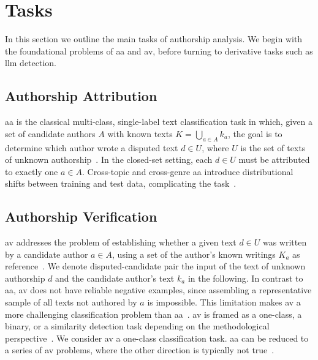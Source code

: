 \section{Tasks}
\label{sec:tasks}

In this section we outline the main tasks of authorship analysis. 
We begin with the foundational problems of \ac{aa} and \ac{av}, before turning to derivative tasks such as \ac{llm} detection.

\subsection{Authorship Attribution}
\ac{aa} is the classical multi-class, single-label text classification task in which, given a set of candidate authors $A$ with known texts $K=\bigcup_{a\in A} k_a$, the goal is to determine which author wrote a disputed text $d \in U$, where $U$ is the set of texts of unknown authorship~\citep{koppel_authorship_2004,barlas_cross_domain_2020}. 
In the closed-set setting, each $d \in U$ must be attributed to exactly one $a \in A$. 
Cross-topic and cross-genre \ac{aa} introduce distributional shifts between training and test data, complicating the task~\citep{barlas_cross_domain_2020}.

\subsection{Authorship Verification}
\ac{av} addresses the problem of establishing whether a given text $d \in U$ was written by a candidate author $a \in A$, using a set of the author’s known writings $K_a$ as reference~\citep{koppel_authorship_2004}.
We denote disputed-candidate pair the input of the text of unknown authorship $d$ and the candidate author's text $k_a$ in the following.
In contrast to \ac{aa}, \ac{av} does not have reliable negative examples, since assembling a representative sample of all texts not authored by 
$a$ is impossible. 
This limitation makes \ac{av} a more challenging classification problem than \ac{aa}~\citep{llm_detection_av_2025,neal_surveying_2018,koppel_authorship_2004}.
\ac{av} is framed as a one-class, a binary, or a similarity detection task depending on the methodological perspective~\citep{neal_surveying_2018,koppel_authorship_2004}.  
We consider \ac{av} a one-class classification task.
\ac{aa} can be reduced to a series of \ac{av} problems, where the other direction is typically not true~\citep{barlas_cross_domain_2020,tyo_state_2022}.


